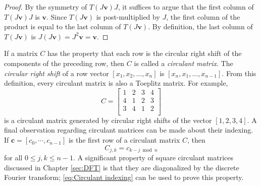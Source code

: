 \documentclass[12pt,notitlepage]{report}
\begin{document}
\begin{proof}
By the symmetry of $T(J\mathbf{v})J$, it suffices to argue that the first column of $T(J\mathbf{v})J$ is $\mathbf{v}$. Since $T(J\mathbf{v})$ is post-multiplied by $J$, the first column of the product is equal to the last column of $T(J\mathbf{v})$. By definition, the last column of $T(J\mathbf{v})$ is $J(J\mathbf{v}) = J^2\mathbf{v} = \mathbf{v}$.
\end{proof}
If a matrix $C$ has the property that each row is the circular right shift of the components of the preceding row, then $C$ is called a \textit{circulant matrix}. The \textit{circular right shift} of a row vector $[x_1,x_2,\ldots,x_n]$ is $[x_n,x_1,\ldots,x_{n-1}]$. From this definition, every circulant matrix is also a Toeplitz matrix. For example,
\[C = \begin{bmatrix}
1 & 2 & 3 & 4 \\
4 & 1 & 2 & 3 \\
3 & 4 & 1 & 2 \\
\end{bmatrix}\] 
is a circulant matrix generated by circular right shifts of the vector $[1,2,3,4]$. A final observation regarding circulant matrices can be made about their indexing. If $\mathbf{c} = [c_0,\cdots,c_{n-1}]$ is the first row of a circulant matrix $C$, then
\begin{equation}
\label{eq:Circulant indexing}
C_{j,k} = c_{k-j \bmod n}
\end{equation}
for all $0 \leq j,k \leq n-1$. A significant property of square circulant matrices discussed in Chapter \ref{sec:DFT} is that they are diagonalized by the discrete Fourier transform; \eqref{eq:Circulant indexing} can be used to prove this property.
\end{document}
